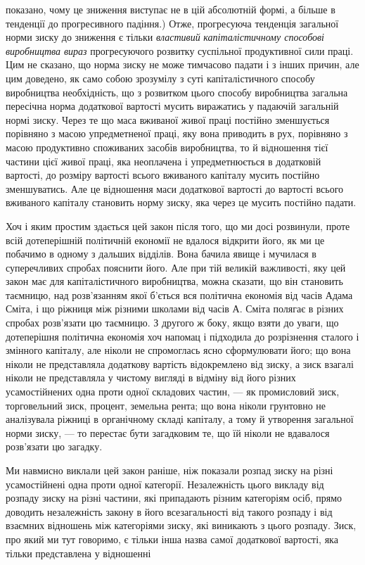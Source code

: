\parcont{}  %
показано, чому це зниження виступає не в цій абсолютній формі,
а більше в тенденції до прогресивного падіння.) Отже, прогресуюча
тенденція загальної норми зиску до зниження є тільки
\emph{властивий} \emph{капіталістичному способові виробництва вираз}
прогресуючого розвитку суспільної продуктивної сили праці.
Цим не сказано, що норма зиску не може тимчасово падати і
з інших причин, але цим доведено, як само собою зрозумілу
з суті капіталістичного способу виробництва необхідність, що
з розвитком цього способу виробництва загальна пересічна норма
додаткової вартості мусить виражатись у падаючій загальній
нормі зиску. Через те що маса вживаної живої праці постійно
зменшується порівняно з масою упредметненої праці, яку вона
приводить в рух, порівняно з масою продуктивно споживаних
засобів виробництва, то й відношення тієї частини цієї живої
праці, яка неоплачена і упредметнюється в додатковій вартості,
до розміру вартості всього вживаного капіталу мусить постійно
зменшуватись. Але це відношення маси додаткової вартості до
вартості всього вживаного капіталу становить норму зиску, яка
через це мусить постійно падати.

Хоч і яким простим здається цей закон після того, що ми досі
розвинули, проте всій дотеперішній політичній економії не вдалося
відкрити його, як ми це побачимо в одному з дальших відділів.
Вона бачила явище і мучилася в суперечливих спробах
пояснити його. Але при тій великій важливості, яку цей закон
має для капіталістичного виробництва, можна сказати, що він
становить таємницю, над розв’язанням якої б’ється вся політична
економія від часів Адама Сміта, і що ріжниця між різними школами
від часів А. Сміта полягає в різних спробах розв’язати цю
таємницю. З другого ж боку, якщо взяти до уваги, що дотеперішня
політична економія хоч напомац і підходила до розрізнення
сталого і змінного капіталу, але ніколи не спромоглась
ясно сформулювати його; що вона ніколи не представляла додаткову
вартість відокремлено від зиску, а зиск взагалі ніколи
не представляла у чистому вигляді в відміну від його різних
усамостійнених одна проти одної складових частин, — як промисловий
зиск, торговельний зиск, процент, земельна рента; що
вона ніколи грунтовно не аналізувала ріжниці в органічному
складі капіталу, а тому й утворення загальної норми зиску, —
то перестає бути загадковим те, що їй ніколи не вдавалося розв’язати
цю загадку.

Ми навмисно виклали цей закон раніше, ніж показали розпад
зиску на різні усамостійнені одна проти одної категорії. Незалежність
цього викладу від розпаду зиску на різні частини,
які припадають різним категоріям осіб, прямо доводить незалежність
закону в його всезагальності від такого розпаду і від
взаємних відношень між категоріями зиску, які виникають з цього
розпаду. Зиск, про який ми тут говоримо, є тільки інша назва
самої додаткової вартості, яка тільки представлена у відношенні
\parbreak{}  %

